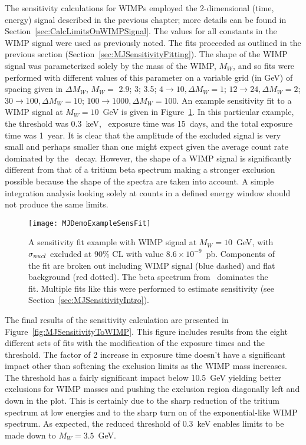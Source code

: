 	The sensitivity calculations for WIMPs employed the 2-dimensional (time, energy) signal described in the previous chapter; more details can be found in Section~\ref{sec:CalcLimitsOnWIMPSignal}.  The values for all constants in the WIMP signal were used as previously noted.  The fits proceeded as outlined in the previous section (Section~\ref{sec:MJSensitivityFitting}).  The shape of the WIMP signal was parameterized solely by the mass of the WIMP, $M_{W}$, and so fits were performed with different values of this parameter on a variable grid (in GeV) of spacing given in $\Delta M_{W}$, $M_{W}=$ 2.9; 3; 3.5; $4\to10, \Delta M_{W} = 1$; $12\to24, \Delta M_{W} = 2$; $30\to100, \Delta M_{W} = 10$; $100\to1000, \Delta M_{W} = 100$.  An example sensitivity fit to a WIMP signal at $M_{W}=10$~GeV is given in Figure~\ref{fig:MJSensitivityToWIMPExample}.  In this particular example, the threshold was 0.3~keV, \hthree~exposure time was 15~days, and the total exposure time was 1~year.  It is clear that the amplitude of the excluded signal is very small and perhaps smaller than one might expect given the average count rate dominated by the \hthree~decay.  However, the shape of a WIMP signal is significantly different from that of a tritium beta spectrum making a stronger exclusion possible because the shape of the spectra are taken into account.  A simple integration analysis looking solely at counts in a defined energy window should not produce the same limits.  
		
			\begin{figure}
				\centering
				\texttt{[image: MJDemoExampleSensFit]}
				\caption[\MJ~\minmod~WIMP sensitivity fit example.]{A sensitivity fit example with WIMP  
				signal at $M_{W}=10$~GeV, with $\sigma_{nucl}$ excluded at 90\% CL with value
				 $8.6\times10^{-9}$~pb.  Components of the fit are broken out including WIMP 
				 signal (blue dashed) and flat background (red dotted).  The beta spectrum from \hthree~dominates the fit.
				Multiple fits like this were performed to estimate sensitivity (see Section~\ref{sec:MJSensitivityIntro}).}
				\label{fig:MJSensitivityToWIMPExample}
			\end{figure}
	
	The final results of the sensitivity calculation are presented in Figure~\ref{fig:MJSensitivityToWIMP}.  This figure includes results from the eight different sets of fits with the modification of the exposure times and the threshold.  The factor of 2 increase in exposure time doesn't have a significant impact other than softening the exclusion limits as the WIMP mass increases.  The threshold has a fairly significant impact below 10.5~GeV yielding better exclusions for WIMP masses and pushing the exclusion region diagonally left and down in the plot.  This is certainly due to the sharp reduction of the tritium spectrum at low energies and to the sharp turn on of the exponential-like WIMP spectrum.  As expected, the reduced threshold of 0.3~keV enables limits to be made down to $M_{W}=3.5$~GeV.  
	
